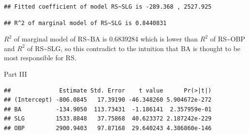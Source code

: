 \documentclass[
]{article}
\newenvironment{Shaded}{\begin{snugshade}}{\end{snugshade}}
\newcommand{\AttributeTok}[1]{\textcolor[rgb]{0.77,0.63,0.00}{#1}}
\newcommand{\DecValTok}[1]{\textcolor[rgb]{0.00,0.00,0.81}{#1}}
\newcommand{\FunctionTok}[1]{\textcolor[rgb]{0.00,0.00,0.00}{#1}}
\newcommand{\NormalTok}[1]{#1}
\newcommand{\OtherTok}[1]{\textcolor[rgb]{0.56,0.35,0.01}{#1}}
\newcommand{\SpecialCharTok}[1]{\textcolor[rgb]{0.00,0.00,0.00}{#1}}
\newcommand{\StringTok}[1]{\textcolor[rgb]{0.31,0.60,0.02}{#1}}
\begin{document}
\begin{Shaded}
\end{Shaded}

\begin{verbatim}
## Fitted coefficient of model RS~SLG is -289.368 , 2527.925
\end{verbatim}

\begin{Shaded}
\end{Shaded}

\begin{verbatim}
## R^2 of marginal model of RS~SLG is 0.8440831
\end{verbatim}

\(R^2\) of marginal model of RS\textasciitilde BA is 0.6839284 which is
lower than \(R^2\) of RS\textasciitilde OBP and \(R^2\) of
RS\textasciitilde SLG, so this contradict to the intuition that BA is
thought to be most responsible for RS.

Part III

\begin{Shaded}
\end{Shaded}

\begin{verbatim}
##              Estimate Std. Error    t value      Pr(>|t|)
## (Intercept) -806.0845   17.39190 -46.348260 5.904672e-272
## BA          -134.9050  113.73431  -1.186141  2.357959e-01
## SLG         1533.8848   37.75868  40.623372 2.187242e-229
## OBP         2900.9403   97.87168  29.640243 4.386860e-146
\end{verbatim}
\end{document}

